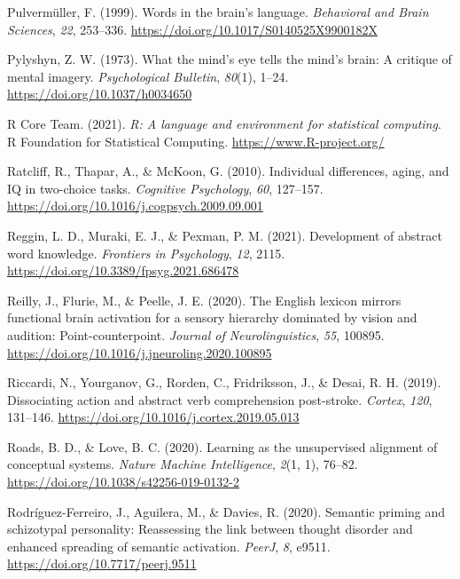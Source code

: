 \documentclass[
  12pt,
  man,floatsintext]{apa7}
\newlength{\cslhangindent}
\newlength{\cslentryspacingunit} %
\newenvironment{CSLReferences}[2] %
 {%
  \setlength{\parindent}{0pt}
  \ifodd #1
  \let\oldpar\par
  \def\par{\hangindent=\cslhangindent\oldpar}
  \fi
  \setlength{\parskip}{#2\cslentryspacingunit}
 }%
 {}
\begin{document}
\begin{CSLReferences}{1}{0}
\leavevmode{}%
Pulvermüller, F. (1999). Words in the brain's language. \emph{Behavioral and Brain Sciences}, \emph{22}, 253--336. \url{https://doi.org/10.1017/S0140525X9900182X}

\leavevmode{}%
Pylyshyn, Z. W. (1973). What the mind's eye tells the mind's brain: {A} critique of mental imagery. \emph{Psychological Bulletin}, \emph{80}(1), 1--24. \url{https://doi.org/10.1037/h0034650}

\leavevmode{}%
R Core Team. (2021). \emph{R: A language and environment for statistical computing}. R Foundation for Statistical Computing. \url{https://www.R-project.org/}

\leavevmode{}%
Ratcliff, R., Thapar, A., \& McKoon, G. (2010). Individual differences, aging, and {IQ} in two-choice tasks. \emph{Cognitive Psychology}, \emph{60}, 127--157. \url{https://doi.org/10.1016/j.cogpsych.2009.09.001}

\leavevmode{}%
Reggin, L. D., Muraki, E. J., \& Pexman, P. M. (2021). Development of abstract word knowledge. \emph{Frontiers in Psychology}, \emph{12}, 2115. \url{https://doi.org/10.3389/fpsyg.2021.686478}

\leavevmode{}%
Reilly, J., Flurie, M., \& Peelle, J. E. (2020). The {English} lexicon mirrors functional brain activation for a sensory hierarchy dominated by vision and audition: {Point-counterpoint}. \emph{Journal of Neurolinguistics}, \emph{55}, 100895. \url{https://doi.org/10.1016/j.jneuroling.2020.100895}

\leavevmode{}%
Riccardi, N., Yourganov, G., Rorden, C., Fridriksson, J., \& Desai, R. H. (2019). Dissociating action and abstract verb comprehension post-stroke. \emph{Cortex}, \emph{120}, 131--146. \url{https://doi.org/10.1016/j.cortex.2019.05.013}

\leavevmode{}%
Roads, B. D., \& Love, B. C. (2020). Learning as the unsupervised alignment of conceptual systems. \emph{Nature Machine Intelligence}, \emph{2}(1, 1), 76--82. \url{https://doi.org/10.1038/s42256-019-0132-2}

\leavevmode{}%
Rodríguez-Ferreiro, J., Aguilera, M., \& Davies, R. (2020). Semantic priming and schizotypal personality: Reassessing the link between thought disorder and enhanced spreading of semantic activation. \emph{PeerJ}, \emph{8}, e9511. \url{https://doi.org/10.7717/peerj.9511}


\end{CSLReferences}
\end{document}
